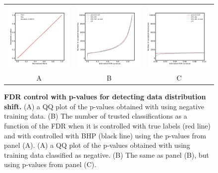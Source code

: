 \documentclass{article}
\begin{document}
\begin{figure}
    \advance\leftskip-0.5cm
        \begin{tabular}{ccc}
 		\includegraphics[width=2.5in]{img/cnn_QQ_shifted.pdf} &
		\includegraphics[width=2.5in]{img/cnn_shifted_fdr_control.pdf} & 
            \includegraphics[width=2.5in]{img/cnn_shifted_fdr_control_loc.pdf}
		\\	
		A & B & C
	\end{tabular}
	\caption{{\bf  FDR control with p-values for detecting data distribution shift.}
		(A) a QQ plot of the p-values obtained with using negative training data. (B) The number of trusted classifications as a function of the FDR when it is controlled with true labels (red line) and with controlled with BHP (black line) using the p-values from panel (A).
		(A) a QQ plot of the p-values obtained with using training data classified as negative. (B) The same as panel (B), but using p-values from panel (C).
	}
	\label{fig:shift}
\end{figure}
\end{document}
